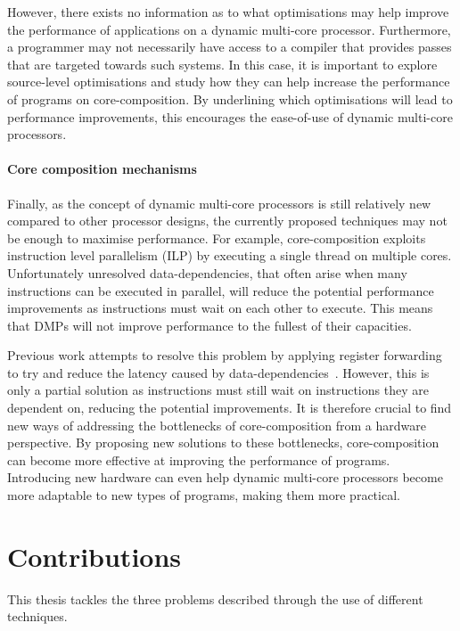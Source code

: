 However, there exists no information as to what optimisations may help improve the performance of applications on a dynamic multi-core processor.
Furthermore, a programmer may not necessarily have access to a compiler that provides passes that are targeted towards such systems.
In this case, it is important to explore source-level optimisations and study how they can help increase the performance of programs on core-composition.
By underlining which optimisations will lead to performance improvements, this encourages the ease-of-use of dynamic multi-core processors.

\paragraph*{Core composition mechanisms} 
Finally, as the concept of dynamic multi-core processors is still relatively new compared to other processor designs, the currently proposed techniques may not be enough to maximise performance.
For example, core-composition exploits instruction level parallelism (ILP) by executing a single thread on multiple cores.
Unfortunately unresolved data-dependencies, that often arise when many instructions can be executed in parallel, will reduce the potential performance improvements as instructions must wait on each other to execute.
This means that DMPs will not improve performance to the fullest of their capacities.

Previous work attempts to resolve this problem by applying register forwarding to try and reduce the latency caused by data-dependencies~\cite{robatmili2011uniproc}.
However, this is only a partial solution as instructions must still wait on instructions they are dependent on, reducing the potential improvements. 
It is therefore crucial to find new ways of addressing the bottlenecks of core-composition from a hardware perspective.
By proposing new solutions to these bottlenecks, core-composition can become more effective at improving the performance of programs.
Introducing new hardware can even help dynamic multi-core processors become more adaptable to new types of programs, making them more practical.

\vspace{-1em}
\section{Contributions}
This thesis tackles the three problems described through the use of different techniques.

